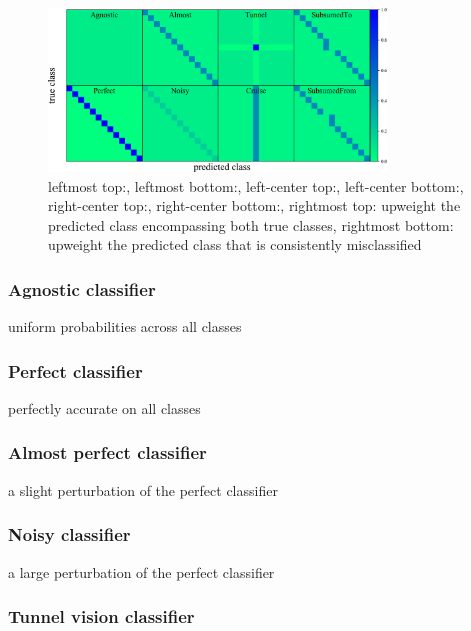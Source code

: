 \begin{figure}
	\begin{center}
    \includegraphics[width=0.8\textwidth]{./fig/all_sim_cm.png}
		\caption{leftmost top:,
    leftmost bottom:,
    left-center top:,
    left-center bottom:,
    right-center top:,
    right-center bottom:,
    rightmost top: upweight the predicted class encompassing both true classes,
    rightmost bottom: upweight the predicted class that is consistently misclassified}
		\label{fig:mock_cm}
	\end{center}
\end{figure}

\subsubsection{Agnostic classifier}
\label{sec:agnostic_data}

uniform probabilities across all classes

\subsubsection{Perfect classifier}
\label{sec:perfect_data}

perfectly accurate on all classes

\subsubsection{Almost perfect classifier}
\label{sec:almost_data}

a slight perturbation of the perfect classifier

\subsubsection{Noisy classifier}
\label{sec:nois_datay}

a large perturbation of the perfect classifier

\subsubsection{Tunnel vision classifier}
\label{sec:tunnel_data}

